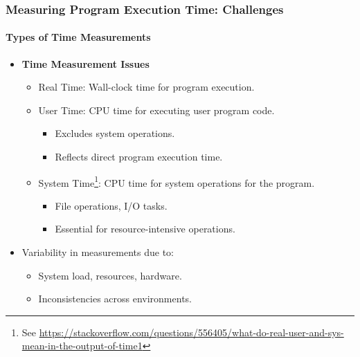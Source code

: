 \documentclass[compress,12pt,bookmark]{beamer}
\begin{document}
\begin{frame}
    \frametitle{Measuring Program Execution Time: Challenges}
    \framesubtitle{Types of Time Measurements}

    \begin{itemize}
        \item \textbf{Time Measurement Issues}
              \begin{itemize}
                  \item Real Time: Wall-clock time for program execution.
                  \item User Time: CPU time for executing user program code.
                        \begin{itemize}
                            \item Excludes system operations.
                            \item Reflects direct program execution time.
                        \end{itemize}
                  \item System Time\footnote{See \url{https://stackoverflow.com/questions/556405/what-do-real-user-and-sys-mean-in-the-output-of-time1}}: CPU time for system operations for the program.
                        \begin{itemize}
                            \item File operations, I/O tasks.
                            \item Essential for resource-intensive operations.
                        \end{itemize}
              \end{itemize}
        \item Variability in measurements due to:
              \begin{itemize}
                  \item System load, resources, hardware.
                  \item Inconsistencies across environments.
              \end{itemize}
    \end{itemize}
\end{frame}
\end{document}
